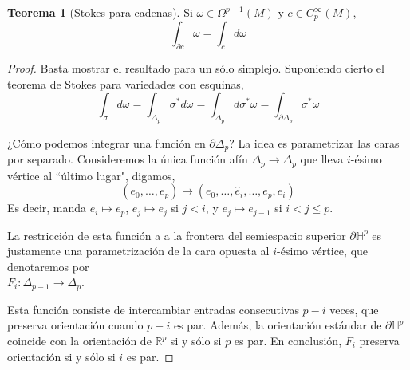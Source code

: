 \documentclass[spanish]{article}
\theoremstyle{definition}
\newtheorem*{teo}{Teorema}
\newcommand{\R}{\mathbb{R}}
\begin{document}
	\begin{teo}[Stokes para cadenas]
		Si $\omega\in\Omega^{p-1}(M)$ y $c\in C^\infty_p(M)$,
		\[\int_{\partial c}\omega=\int_cd\omega\]
	\end{teo}
	\begin{proof}
		Basta mostrar el resultado para un sólo simplejo. Suponiendo cierto el teorema de Stokes para variedades con esquinas,
		\[\int_{\sigma}d\omega=\int_{\Delta_p}\sigma^*d\omega=\int_{\Delta_p}d\sigma^*\omega=\int_{\partial \Delta_p}\sigma^*\omega\]
		
		¿Cómo podemos integrar una función en $\partial\Delta_p$? La idea es parametrizar las caras por separado. Consideremos la única función afín $\Delta_p\to\Delta_p$ que lleva $i$-ésimo vértice al ``último lugar", digamos,
		\[(e_0,\ldots,e_p)\mapsto (e_0,\ldots,\hat{e}_i,\ldots,e_p,e_i)\]
		Es decir, manda $e_i\mapsto e_p$, $e_j\mapsto e_j$ si $j<i$, y $e_j\mapsto e_{j-1}$ si $i<j\leq p$.
		
		La restricción de esta función a a la frontera del semiespacio superior $\partial\mathbb{H}^p$ es justamente una parametrización de la cara opuesta al $i$-ésimo vértice, que denotaremos por\\ $F_{i}:\Delta_{p-1}\to\Delta_p$.
		
		Esta función consiste de intercambiar entradas consecutivas $p-i$ veces, que preserva orientación cuando $p-i$ es par. Además, la orientación estándar de $\partial\mathbb{H}^p$ coincide con la orientación de $\R^p$ si y sólo si $p$ es par. En conclusión, $F_i$ preserva orientación si y sólo si $i$ es par.
		
		
		

	
		

\end{proof}
\end{document}
